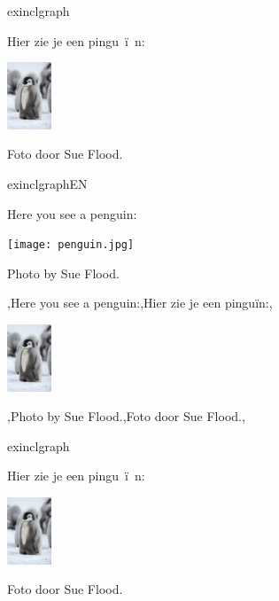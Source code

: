 \documentclass[presentatie.tex]{subfiles}
\begin{document}
\begin{saveblock}{exinclgraph}
	\begin{highlightblock}[linewidth=0.95\textwidth,framexleftmargin=0.25em]
		Hier zie je een pingu~\"i~n:
		
		\includegraphics[height=2cm]{pinguin.jpg}
		
		Foto door Sue Flood.
	\end{highlightblock}
\end{saveblock}

\begin{saveblock}{exinclgraphEN}
	\begin{highlightblock}[linewidth=0.95\textwidth,framexleftmargin=0.25em]
		Here you see a penguin:
		
		\texttt{[image: penguin.jpg]}
		
		Photo by Sue Flood.
	\end{highlightblock}
\end{saveblock}

\begin{frame}{}
	\vspace{-28px}
	
	\begin{penExResult}
		\lang,Here you see a penguin:,Hier zie je een pinguïn:,
		
		\includegraphics[height=2cm]{assets/pinguin.jpg}
		
		\lang,Photo by Sue Flood.,Foto door Sue Flood.,
	\end{penExResult}
\end{frame}

\begin{saveblock}{exinclgraph}
	\begin{highlightblock}[linewidth=0.95\textwidth,framexleftmargin=0.25em]
		Hier zie je een pingu~\"i~n:
		\begin{center}
			\includegraphics[height=2cm]{pinguin.jpg}
		\end{center}
		Foto door Sue Flood.
	\end{highlightblock}
\end{saveblock}
\end{document}
